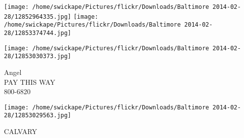 \documentclass[10pt,letterpaper]{article}
\begin{document}
\texttt{[image: /home/swickape/Pictures/flickr/Downloads/Baltimore 2014-02-28/12852964335.jpg]}
\texttt{[image: /home/swickape/Pictures/flickr/Downloads/Baltimore 2014-02-28/12853374744.jpg]}

\vspace{0.25in}
\texttt{[image: /home/swickape/Pictures/flickr/Downloads/Baltimore 2014-02-28/12853030373.jpg]}

Angel\\
PAY THIS WAY\\
800{-}6820\\
\pagebreak

\texttt{[image: /home/swickape/Pictures/flickr/Downloads/Baltimore 2014-02-28/12853029563.jpg]}

CALVARY\\
\pagebreak
\end{document}
